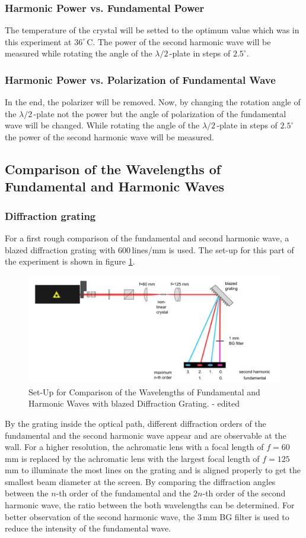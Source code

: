 \documentclass[10pt, a4paper, notitlepage, DIV=15]{scrartcl}
\begin{document}
\subsubsection{Harmonic Power vs. Fundamental Power}
The temperature of the crystal will be setted to the optimum value which was in this experiment at $36^{\circ}\,$C. The power of the second harmonic wave will be measured while rotating the angle of the $\lambda/2\,$-plate in steps of $2.5^\circ$. 
\subsubsection{Harmonic Power vs. Polarization of Fundamental Wave}
In the end, the polarizer will be removed. Now, by changing the rotation angle of the $\lambda/2\,$-plate not the power but the angle of polarization of the fundamental wave will be changed. While rotating the angle of the $\lambda/2\,$-plate in steps of $2.5^\circ$ the power of the second harmonic wave will be measured.
\subsection{Comparison of the Wavelengths of Fundamental and Harmonic Waves}
\subsubsection{Diffraction grating}
For a first rough comparison of the fundamental and second harmonic wave, a blazed diffraction grating with $600\,$lines/mm is used. The set-up for this part of the experiment is shown in figure \ref{fig:grating}.
\begin{figure}[h]
	\centering
	\includegraphics[width=1\textwidth]{grating}
	\caption{Set-Up for Comparison of the Wavelengths of Fundamental and Harmonic Waves with blazed Diffraction Grating. \cite{description} - edited}
	\label{fig:grating}
\end{figure}
\newline
By the grating inside the optical path, different diffraction orders of the fundamental and the second harmonic wave appear and are observable at the wall. For a higher resolution, the achromatic lens with a focal length of $f=60\,$mm is replaced by the achromatic lens with the largest focal length of $f=125\,$mm to illuminate the most lines on the grating and is aligned properly to get the smallest beam diameter at the screen. By comparing the diffraction angles between the $n$-th order of the fundamental and the $2n$-th order of the second harmonic wave, the ratio between the both wavelengths can be determined. For better observation of the second harmonic wave, the $3\,$mm BG filter is used to reduce the intensity of the fundamental wave. 
\end{document}
